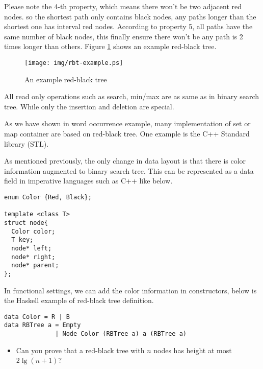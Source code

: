 \documentclass{article}
\begin{document}
Please note the 4-th property, which means there won't be two adjacent
red nodes. so the shortest path only contains black nodes, any paths
longer than the shortest one has interval red nodes. According to
property 5, all paths have the same number of black nodes,
this finally ensure there won't be any path is 2 times longer than
others\cite{wiki}. Figure \ref{fig:rbt-example} shows an example
red-black tree.

\begin{figure}[htbp]
       \begin{center}
	\texttt{[image: img/rbt-example.ps]}
        \caption{An example red-black tree} \label{fig:rbt-example}
       \end{center}
\end{figure}

All read only operations such as search, min/max are as same as in
binary search tree. While only the insertion and deletion are special.

As we have shown in word occurrence example, many implementation of
set or map container are based on red-black tree. One example is the
C++ Standard library (STL)\cite{sgi-stl}.

As mentioned previously, the only change in data layout is that
there is color information augmented to binary search tree.
This can be represented as a data field in imperative languages
such as C++ like below.

\lstset{language=C++}
\begin{lstlisting}
enum Color {Red, Black};

template <class T>
struct node{
  Color color;
  T key;
  node* left;
  node* right;
  node* parent;
};
\end{lstlisting}

In functional settings, we can add the color information
in constructors, below is the Haskell example of red-black tree
definition.

\lstset{language=Haskell}
\begin{lstlisting}
data Color = R | B
data RBTree a = Empty
              | Node Color (RBTree a) a (RBTree a)
\end{lstlisting}

\begin{Exercise}

\begin{itemize}
\item Can you prove that a red-black tree with $n$ nodes has
height at most $2 \lg (n+1)$?
\end{itemize}

\end{Exercise}
\end{document}
